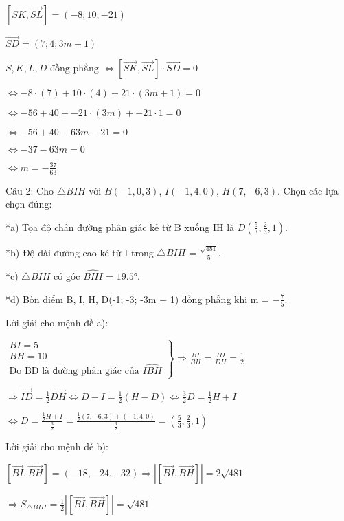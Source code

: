 \documentclass[a4paper,12pt]{article}
\begin{document}
\([\overrightarrow{SK}, \overrightarrow{SL}] = (-8; 10; -21)\)

\(\overrightarrow{SD} = (7; 4; 3m + 1)\)

\(S, K, L, D \text{ đồng phẳng } \Leftrightarrow [\overrightarrow{SK}, \overrightarrow{SL}] \cdot \overrightarrow{SD} = 0\)

\(\Leftrightarrow -8 \cdot (7) + 10 \cdot (4) - 21 \cdot (3m + 1) = 0\)

\(\Leftrightarrow -56 + 40 + -21 \cdot (3m) + -21 \cdot 1 = 0\)

\(\Leftrightarrow -56 + 40 - 63m - 21 = 0\)

\(\Leftrightarrow -37 - 63m = 0\)

\(\Leftrightarrow m = -\frac{37}{63}\)



Câu 2: Cho \( \triangle BIH \) với \( B(-1, 0, 3) \), \( I(-1, 4, 0) \), \( H(7, -6, 3) \). Chọn các lựa chọn đúng:

*a) Tọa độ chân đường phân giác kẻ từ B xuống IH là \( D(\frac{5}{3}, \frac{2}{3}, 1) \).

*b) Độ dài đường cao kẻ từ I trong \( \triangle BIH \) = \( \frac{\sqrt{481}}{5} \).

*c) \( \triangle BIH \) có góc \( \widehat{BHI} \) = \( 19.5° \).

*d) Bốn điểm B, I, H, D(-1; -3; -3m + 1) đồng phẳng khi m = \(-\frac{7}{5}\).

Lời giải cho mệnh đề a):

\(\left. \begin{array}{l}
BI = 5 \\
BH = 10 \\
\text{Do BD là đường phân giác của } \widehat{IBH}
\end{array} \right\} \Rightarrow \frac{BI}{BH} = \frac{ID}{DH} = \frac{1}{2}\)

\(\Rightarrow \overrightarrow{ID} = \frac{1}{2}\overrightarrow{DH} \Leftrightarrow D - I = \frac{1}{2}(H - D) \Leftrightarrow \frac{3}{2}D = \frac{1}{2}H + I\)

\(\Leftrightarrow D = \frac{\frac{1}{2}H + I}{\frac{3}{2}} = \frac{\frac{1}{2}(7, -6, 3) + (-1, 4, 0)}{\frac{3}{2}} = (\frac{5}{3}, \frac{2}{3}, 1)\)

Lời giải cho mệnh đề b):

\([\overrightarrow{BI}, \overrightarrow{BH}] = (-18, -24, -32) \Rightarrow |[\overrightarrow{BI}, \overrightarrow{BH}]| = 2\sqrt{481}\)

\(\Rightarrow S_{\triangle BIH} = \frac{1}{2} |[\overrightarrow{BI}, \overrightarrow{BH}]| = \sqrt{481}\)
\end{document}
